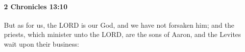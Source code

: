 
		\paragraph{2 Chronicles 13:10} %
			\label{2CHRONICLES-13-10}

			But as for us, the LORD is our God, and we have not forsaken him; and the priests, which minister unto the LORD, are the sons of Aaron, and the Levites wait upon their business:


